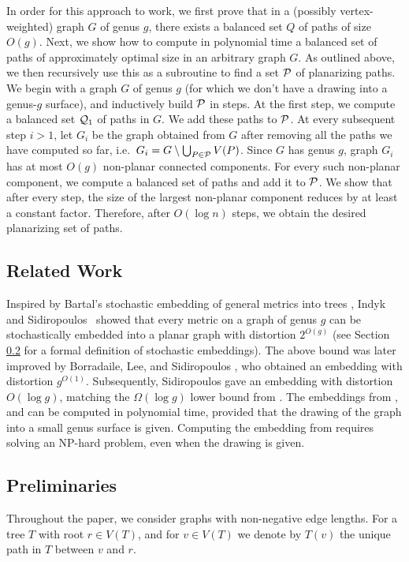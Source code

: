 \documentclass[envcountsect]{llncs}
\begin{document}
In order for this approach to work, we first prove that in a (possibly vertex-weighted) graph $G$ of genus $g$, 
there exists a balanced set $Q$ of paths of size $O(g)$.
Next, we show how to compute in polynomial time a balanced set of paths of approximately optimal size in an arbitrary graph $G$.
As outlined above, we then recursively use this as a subroutine to find a set ${\cal P}$ of planarizing paths.
We begin with a graph $G$ of genus $g$ (for which we don't have a drawing into a genus-$g$ surface), and 
inductively build ${\cal P}$ in steps.
At the first step, we compute a balanced set ${\cal Q}_1$ of paths in $G$.
We add these paths to ${\cal P}$.
At every subsequent step $i>1$, let $G_i$ be the graph obtained from $G$ after removing all the paths we have computed so far, i.e.~$G_i=G\setminus \bigcup_{P\in {\cal P}} V(P)$.
Since $G$ has genus $g$, graph $G_i$ has at most $O(g)$ non-planar connected components.
For every such non-planar component, we compute a balanced set of paths and add it to ${\cal P}$.
We show that after every step, the size of the largest non-planar component reduces by at least a constant factor.
Therefore, after $O(\log n)$ steps, we obtain the desired planarizing set of paths.


\subsection{Related Work}

Inspired by Bartal's stochastic embedding of general metrics into
trees \cite{Bar96}, Indyk and Sidiropoulos~\cite{indyk_genus} showed that every metric on a graph of genus $g$ can be stochastically embedded into a planar graph with distortion $2^{O(g)}$
(see Section \ref{sec:prelims} for a formal definition of
stochastic embeddings).
The above bound was later improved by Borradaile, Lee, and Sidiropoulos \cite{BLS09}, who obtained an embedding with distortion $g^{O(1)}$.
Subsequently, Sidiropoulos \cite{sidiropoulos2010optimal} gave an embedding with distortion $O(\log g)$, matching the $\Omega(\log g)$ lower bound from \cite{BLS09}.
The embeddings from \cite{indyk_genus}, and \cite{sidiropoulos2010optimal} can be computed in polynomial time, provided that the drawing of the graph into a small genus surface is given.
Computing the embedding from \cite{BLS09} requires solving an NP-hard problem, even when the drawing is given.


\subsection{Preliminaries}\label{sec:prelims}
Throughout the paper, we consider graphs
with non-negative edge lengths.
For a tree $T$ with root $r\in V(T)$, and for $v\in V(T)$ we denote by $T(v)$ the unique path in $T$ between $v$ and $r$.
\end{document}

